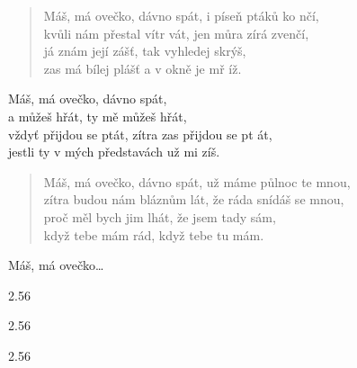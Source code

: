 \begin{song}{}
\begin{verse}
   Máš, má ovečko, dávno spát, i píseň ptáků ko nčí, \\
   kvůli nám přestal vítr vát, jen můra zírá zvenčí, \\
   já znám její zášť, tak vyhledej skrýš, \\
   zas má bílej plášť a v okně je mř íž.
\end{verse}
\begin{refren}
   Máš, má ovečko, dávno spát, \\
   a můžeš hřát, ty mě můžeš hřát, \\
   vždyť přijdou se ptát, zítra zas přijdou se pt át, \\
   jestli ty v mých představách už mi zíš.
\end{refren}



\begin{verse}
   Máš, má ovečko, dávno spát, už máme půlnoc te mnou, \\
   zítra budou nám bláznům lát, že ráda snídáš se mnou, \\
   proč měl bych jim lhát, že jsem tady sám, \\
   když tebe mám rád, když tebe tu mám.
\end{verse}
\begin{refren}
    Máš, má ovečko\ldots
\end{refren}
\end{song}


\begin{tab}
  \begin{tabbar}{2.5}{6}
    \tabchordD
  \end{tabbar}
  \begin{tabbar}{2.5}{6}
    \tabchordA
  \end{tabbar}
  \begin{tabbar}{2.5}{6}
    \tabchordG[1,1][3,2,0,0,3,3]
  \end{tabbar}
\end{tab}
\pagebreak
